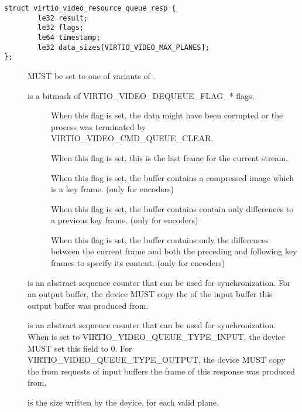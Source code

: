 \begin{description}
\begin{lstlisting}
struct virtio_video_resource_queue_resp {
        le32 result;
        le32 flags;
        le64 timestamp;
        le32 data_sizes[VIRTIO_VIDEO_MAX_PLANES];
};
\end{lstlisting}
\begin{description}
\item[] MUST be set to one of variants of .
\item[] is a bitmask of VIRTIO_VIDEO_DEQUEUE_FLAG_* flags.
  \begin{description}
  \item[] When this flag is set, the data
    might have been corrupted or the process was terminated by
    VIRTIO_VIDEO_CMD_QUEUE_CLEAR.
  \item[] When this flag is set, this is
    the last frame for the current stream.
  \item[] When this flag is set, the
    buffer contains a compressed image which is a key frame. (only for encoders)
  \item[] When this flag is set, the
    buffer contains contain only differences to a previous key frame. (only for
    encoders)
  \item[] When this flag is set,
    the buffer contains only the differences between the current frame and both
    the preceding and following key frames to specify its content. (only for
    encoders)
  \end{description}
\item[] is an abstract sequence counter that can be
  used for synchronization. For an output buffer, the device MUST copy
  the  of the input buffer this output buffer was
  produced from.
\item[] is an abstract sequence counter that can be
  used for synchronization. When  is set to
  VIRTIO_VIDEO_QUEUE_TYPE_INPUT, the device MUST set this field to 0.
  For VIRTIO_VIDEO_QUEUE_TYPE_OUTPUT, the device MUST copy the 
  from requests of input buffers the frame of this response was produced from.
\item[] is the size written by the device, for each valid
  plane.
\end{description}


\end{description}
